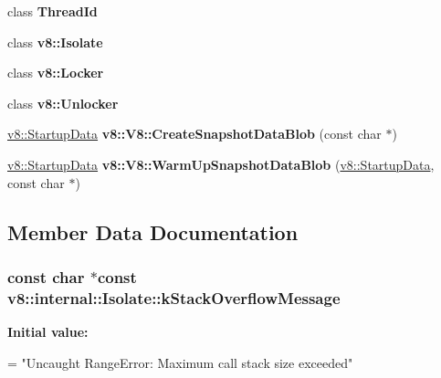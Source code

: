 \begin{DoxyCompactItemize}
\item 
class {\bfseries Thread\+Id}\hypertarget{classv8_1_1internal_1_1_isolate_a3d7f08d995559e3358af66ef439e3490}{}\label{classv8_1_1internal_1_1_isolate_a3d7f08d995559e3358af66ef439e3490}

\item 
class {\bfseries v8\+::\+Isolate}\hypertarget{classv8_1_1internal_1_1_isolate_aa4398493fc805d9e746396ecf8002375}{}\label{classv8_1_1internal_1_1_isolate_aa4398493fc805d9e746396ecf8002375}

\item 
class {\bfseries v8\+::\+Locker}\hypertarget{classv8_1_1internal_1_1_isolate_a2a2550edf3d001d59bea4473ca370426}{}\label{classv8_1_1internal_1_1_isolate_a2a2550edf3d001d59bea4473ca370426}

\item 
class {\bfseries v8\+::\+Unlocker}\hypertarget{classv8_1_1internal_1_1_isolate_a9944a29aae4e98edfd36fdb0aa831ef0}{}\label{classv8_1_1internal_1_1_isolate_a9944a29aae4e98edfd36fdb0aa831ef0}

\item 
\hyperlink{classv8_1_1_startup_data}{v8\+::\+Startup\+Data} {\bfseries v8\+::\+V8\+::\+Create\+Snapshot\+Data\+Blob} (const char $\ast$)\hypertarget{classv8_1_1internal_1_1_isolate_ab4f164b3287147cd4f746a84cb2bb58c}{}\label{classv8_1_1internal_1_1_isolate_ab4f164b3287147cd4f746a84cb2bb58c}

\item 
\hyperlink{classv8_1_1_startup_data}{v8\+::\+Startup\+Data} {\bfseries v8\+::\+V8\+::\+Warm\+Up\+Snapshot\+Data\+Blob} (\hyperlink{classv8_1_1_startup_data}{v8\+::\+Startup\+Data}, const char $\ast$)\hypertarget{classv8_1_1internal_1_1_isolate_a873c6f05e1c7cc5d65cda88f547ee2c1}{}\label{classv8_1_1internal_1_1_isolate_a873c6f05e1c7cc5d65cda88f547ee2c1}

\end{DoxyCompactItemize}


\subsection{Member Data Documentation}
\subsubsection[{\texorpdfstring{k\+Stack\+Overflow\+Message}{kStackOverflowMessage}}]{\setlength{\rightskip}{0pt plus 5cm}const char $\ast$const v8\+::internal\+::\+Isolate\+::k\+Stack\+Overflow\+Message\hspace{0.3cm}{\ttfamily [static]}}\hypertarget{classv8_1_1internal_1_1_isolate_a313c6fd713fcc52007667fd9fe2bf065}{}\label{classv8_1_1internal_1_1_isolate_a313c6fd713fcc52007667fd9fe2bf065}
{\bfseries Initial value\+:}
\begin{DoxyCode}
=
  \textcolor{stringliteral}{"Uncaught RangeError: Maximum call stack size exceeded"}
\end{DoxyCode}


